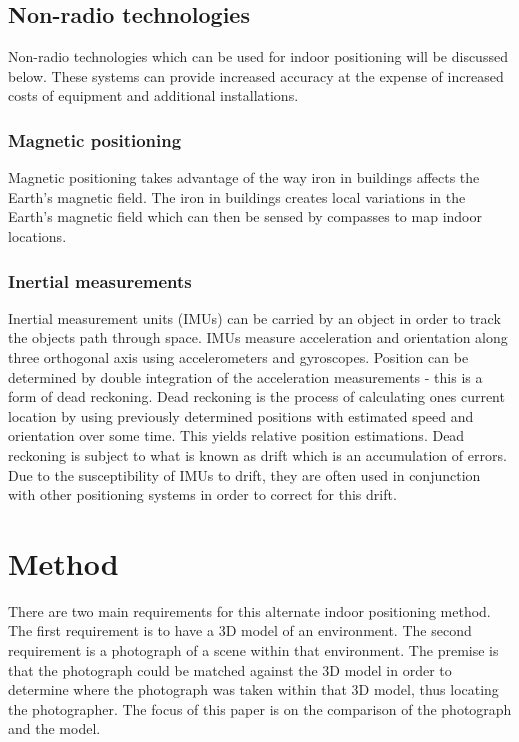\documentclass[11pt,a4paper]{report}
\begin{document}
	\section{Non-radio technologies}
		Non-radio technologies which can be used for indoor positioning will be discussed below. These systems can provide increased accuracy at the expense of increased costs of equipment and additional installations.
	
	\subsection{Magnetic positioning}
		Magnetic positioning takes advantage of the way iron in buildings affects the Earth's magnetic field. The iron in buildings creates local variations in the Earth's magnetic field which can then be sensed by compasses to map indoor locations.
		\cite{supreeth_sudhakaran_geospatial_2014}
	
	\subsection{Inertial measurements}
		Inertial measurement units (IMUs) can be carried by an object in order to track the objects path through space. IMUs measure acceleration and orientation along three orthogonal axis using accelerometers and gyroscopes. Position can be determined by double integration of the acceleration measurements - this is a form of dead reckoning. Dead reckoning is the process of calculating ones current location by using previously determined positions with estimated speed and orientation over some time. This yields relative position estimations. Dead reckoning is subject to what is known as drift which is an accumulation of errors. Due to the susceptibility of IMUs to drift, they are often used in conjunction with other positioning systems in order to correct for this drift.

\newpage
\chapter{Method}
	There are two main requirements for this alternate indoor positioning method. The first requirement is to have a 3D model of an environment. The second requirement is a photograph of a scene within that environment. The premise is that the photograph could be matched against the 3D model in order to determine where the photograph was taken within that 3D model, thus locating the photographer. The focus of this paper is on the comparison of the photograph and the model.
	
\end{document}
